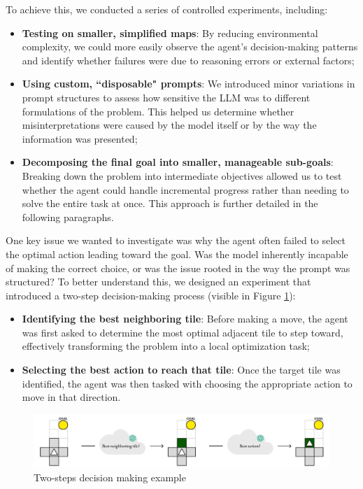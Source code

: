 To achieve this, we conducted a series of controlled experiments, including:
\begin{itemize}
  \item \textbf{Testing on smaller, simplified maps}: By reducing environmental complexity,
    we could more easily observe the agent's decision-making patterns and
    identify whether failures were due to reasoning errors or external factors;

  \item \textbf{Using custom, ``disposable" prompts}: We introduced minor variations
    in prompt structures to assess how sensitive the LLM was to different formulations
    of the problem. This helped us determine whether misinterpretations were
    caused by the model itself or by the way the information was presented;

  \item \textbf{Decomposing the final goal into smaller, manageable sub-goals}: Breaking
    down the problem into intermediate objectives allowed us to test whether the
    agent could handle incremental progress rather than needing to solve the entire
    task at once. This approach is further detailed in the following paragraphs.
\end{itemize}

One key issue we wanted to investigate was why the agent often failed to select
the optimal action leading toward the goal. Was the model inherently incapable of
making the correct choice, or was the issue rooted in the way the prompt was
structured? To better understand this, we designed an experiment that introduced
a two-step decision-making process (visible in Figure \ref{fig:extra}):
\begin{itemize}
  \item \textbf{Identifying the best neighboring tile}: Before making a move,
    the agent was first asked to determine the most optimal adjacent tile to
    step toward, effectively transforming the problem into a local optimization task;

  \item \textbf{Selecting the best action to reach that tile}: Once the target tile
    was identified, the agent was then tasked with choosing the appropriate
    action to move in that direction.
\end{itemize}

\vspace{7mm}
\begin{figure}[h!]
  \centering
  \includegraphics[width=\textwidth]{images/agent_development/extra.pdf}
  \caption{Two-steps decision making example}
  \label{fig:extra}
\end{figure}
\vspace{7mm}

